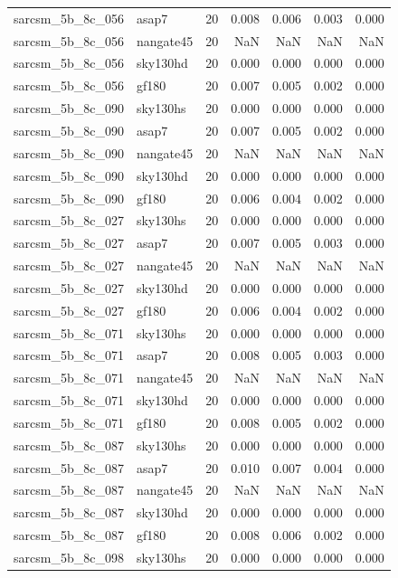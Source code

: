 \begin{tabular}{llrrrrr}
sarcsm\_5b\_8c\_056 & asap7 & 20 & 0.008 & 0.006 & 0.003 & 0.000 \\
sarcsm\_5b\_8c\_056 & nangate45 & 20 & NaN & NaN & NaN & NaN \\
sarcsm\_5b\_8c\_056 & sky130hd & 20 & 0.000 & 0.000 & 0.000 & 0.000 \\
sarcsm\_5b\_8c\_056 & gf180 & 20 & 0.007 & 0.005 & 0.002 & 0.000 \\
sarcsm\_5b\_8c\_090 & sky130hs & 20 & 0.000 & 0.000 & 0.000 & 0.000 \\
sarcsm\_5b\_8c\_090 & asap7 & 20 & 0.007 & 0.005 & 0.002 & 0.000 \\
sarcsm\_5b\_8c\_090 & nangate45 & 20 & NaN & NaN & NaN & NaN \\
sarcsm\_5b\_8c\_090 & sky130hd & 20 & 0.000 & 0.000 & 0.000 & 0.000 \\
sarcsm\_5b\_8c\_090 & gf180 & 20 & 0.006 & 0.004 & 0.002 & 0.000 \\
sarcsm\_5b\_8c\_027 & sky130hs & 20 & 0.000 & 0.000 & 0.000 & 0.000 \\
sarcsm\_5b\_8c\_027 & asap7 & 20 & 0.007 & 0.005 & 0.003 & 0.000 \\
sarcsm\_5b\_8c\_027 & nangate45 & 20 & NaN & NaN & NaN & NaN \\
sarcsm\_5b\_8c\_027 & sky130hd & 20 & 0.000 & 0.000 & 0.000 & 0.000 \\
sarcsm\_5b\_8c\_027 & gf180 & 20 & 0.006 & 0.004 & 0.002 & 0.000 \\
sarcsm\_5b\_8c\_071 & sky130hs & 20 & 0.000 & 0.000 & 0.000 & 0.000 \\
sarcsm\_5b\_8c\_071 & asap7 & 20 & 0.008 & 0.005 & 0.003 & 0.000 \\
sarcsm\_5b\_8c\_071 & nangate45 & 20 & NaN & NaN & NaN & NaN \\
sarcsm\_5b\_8c\_071 & sky130hd & 20 & 0.000 & 0.000 & 0.000 & 0.000 \\
sarcsm\_5b\_8c\_071 & gf180 & 20 & 0.008 & 0.005 & 0.002 & 0.000 \\
sarcsm\_5b\_8c\_087 & sky130hs & 20 & 0.000 & 0.000 & 0.000 & 0.000 \\
sarcsm\_5b\_8c\_087 & asap7 & 20 & 0.010 & 0.007 & 0.004 & 0.000 \\
sarcsm\_5b\_8c\_087 & nangate45 & 20 & NaN & NaN & NaN & NaN \\
sarcsm\_5b\_8c\_087 & sky130hd & 20 & 0.000 & 0.000 & 0.000 & 0.000 \\
sarcsm\_5b\_8c\_087 & gf180 & 20 & 0.008 & 0.006 & 0.002 & 0.000 \\
sarcsm\_5b\_8c\_098 & sky130hs & 20 & 0.000 & 0.000 & 0.000 & 0.000 \\

\end{tabular}
